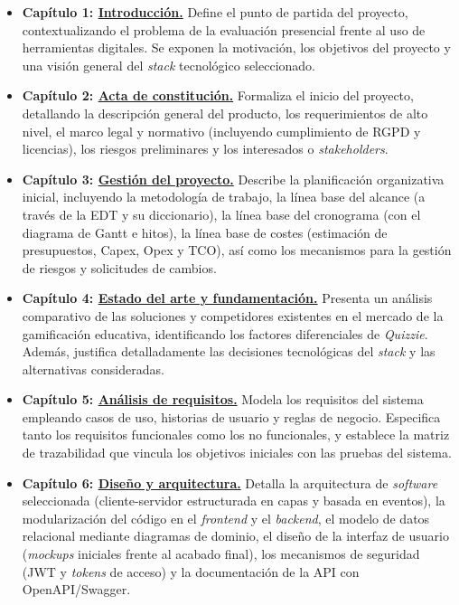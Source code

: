 \begin{itemize}
    \item \textbf{Capítulo 1: \hyperref[cap:introduccion]{Introducción.}} Define el punto de partida del proyecto, contextualizando el problema de la evaluación presencial frente al uso de herramientas digitales. Se exponen la motivación, los objetivos del proyecto y una visión general del \textit{stack} tecnológico seleccionado.
    \item \textbf{Capítulo 2: \hyperref[cap:acta_de_constitucion]{Acta de constitución.}} Formaliza el inicio del proyecto, detallando la descripción general del producto, los requerimientos de alto nivel, el marco legal y normativo (incluyendo cumplimiento de RGPD y licencias), los riesgos preliminares y los interesados o \textit{stakeholders}.
    \item \textbf{Capítulo 3: \hyperref[cap:gestion_del_proyecto]{Gestión del proyecto.}} Describe la planificación organizativa inicial, incluyendo la metodología de trabajo, la línea base del alcance (a través de la EDT y su diccionario), la línea base del cronograma (con el diagrama de Gantt e hitos), la línea base de costes (estimación de presupuestos, Capex, Opex y TCO), así como los mecanismos para la gestión de riesgos y solicitudes de cambios.
    \item \textbf{Capítulo 4: \hyperref[cap:estado_del_arte_y_fundamentacion]{Estado del arte y fundamentación.}} Presenta un análisis comparativo de las soluciones y competidores existentes en el mercado de la gamificación educativa, identificando los factores diferenciales de \textit{Quizzie}. Además, justifica detalladamente las decisiones tecnológicas del \textit{stack} y las alternativas consideradas.
    \item \textbf{Capítulo 5: \hyperref[cap:analisis_de_requisitos]{Análisis de requisitos.}} Modela los requisitos del sistema empleando casos de uso, historias de usuario y reglas de negocio. Especifica tanto los requisitos funcionales como los no funcionales, y establece la matriz de trazabilidad que vincula los objetivos iniciales con las pruebas del sistema.
    \item \textbf{Capítulo 6: \hyperref[cap:diseno_y_arquitectura]{Diseño y arquitectura.}} Detalla la arquitectura de \textit{software} seleccionada (cliente-servidor estructurada en capas y basada en eventos), la modularización del código en el \textit{frontend} y el \textit{backend}, el modelo de datos relacional mediante diagramas de dominio, el diseño de la interfaz de usuario (\textit{mockups} iniciales frente al acabado final), los mecanismos de seguridad (JWT y \textit{tokens} de acceso) y la documentación de la API con OpenAPI/Swagger.

\end{itemize}
